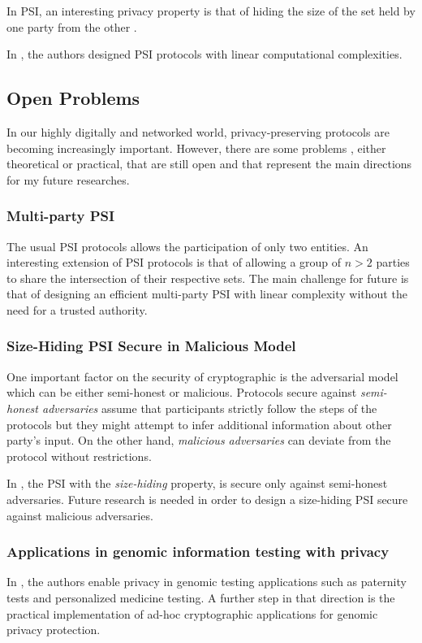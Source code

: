 \documentclass[dvips,12pt]{article}
\begin{document}
In PSI, an interesting privacy property is that of hiding the size of the set held by one party from the other \cite{size-psi}.

In \cite{lin-psi,linear-psi}, the authors designed PSI protocols with linear computational complexities.

\subsection{Open Problems}
In our highly digitally and networked world, privacy-preserving protocols are becoming increasingly important. 
However, there are some problems \cite{dissertation}, either theoretical or practical, that are still open and that represent the main directions for my future researches.
\subsubsection{Multi-party PSI}
The usual PSI protocols allows the participation of only two entities. 
An interesting extension of PSI protocols is that of allowing a group of $n > 2$ parties to share the intersection of their respective sets. The main challenge for future is that of designing an efficient multi-party PSI with linear complexity without the need for a trusted authority.
\subsubsection{Size-Hiding PSI Secure in Malicious Model}
One important factor on the security of cryptographic is the adversarial model which can be either semi-honest or malicious. Protocols secure against \emph{semi-honest adversaries} assume that participants strictly follow the steps of the protocols but they might attempt to infer additional information about other party's input. On the other hand, \emph{malicious adversaries} can deviate from the protocol without restrictions.

In \cite{size-psi}, the PSI with the \emph{size-hiding} property, is secure only against semi-honest adversaries. Future research is needed in order to design a size-hiding PSI secure against malicious adversaries. 
\subsubsection{Applications in genomic information testing with privacy}
In \cite{genome}, the authors enable privacy in genomic testing applications such as paternity tests and personalized medicine testing. A further step in that direction is the practical implementation of ad-hoc cryptographic applications for genomic privacy protection. 
\end{document}

